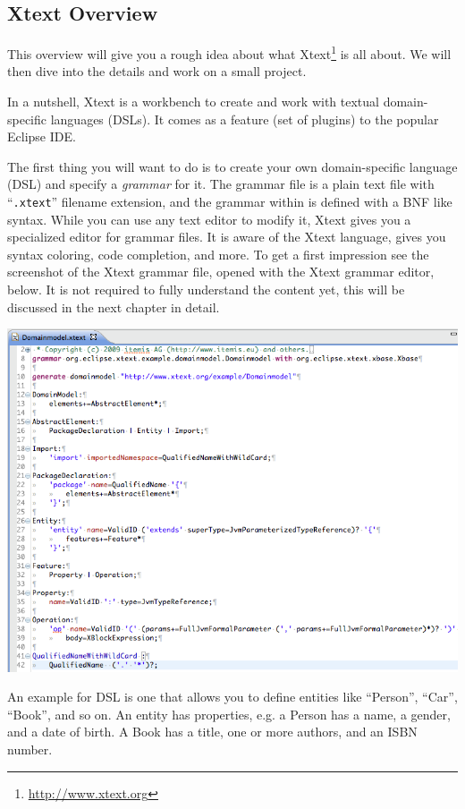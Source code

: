 \subsection{Xtext Overview}

This overview will give you a rough idea about what
Xtext\footnote{\url{http://www.xtext.org}} is all about. We will then dive into
the details and work on a small project.

In a nutshell, Xtext is a workbench to create and work with textual
domain-specific languages (DSLs). It comes as a feature (set of plugins) to the
popular Eclipse IDE.

The first thing you will want to do is to create your own domain-specific
language (DSL) and specify a \emph{grammar} for it. The grammar file is a plain
text file with ``\texttt{.xtext}'' filename extension, and the grammar within is
defined with a BNF like syntax. While you can use any text editor to modify it,
Xtext gives you a specialized editor for grammar files. It is aware of the Xtext
language, gives you syntax coloring, code completion, and more. To get a first
impression see the screenshot of the Xtext grammar file, opened with the Xtext
grammar editor, below. It is not required to fully understand the content yet,
this will be discussed in the next chapter in detail.

\includegraphics[width=16cm]{images/intro/overview-xtext-grammar.png}

An example for DSL is one that allows you to define entities like ``Person'',
``Car'', ``Book'', and so on.
An entity has properties, e.g. a
Person has a name, a gender, and a date of birth. A Book has a title, one or
more authors, and an ISBN number.

